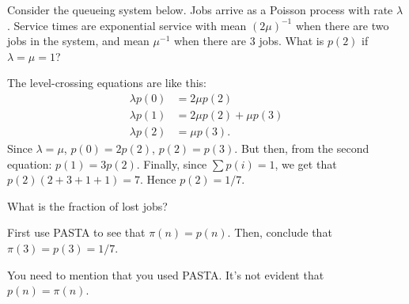\begin{exercise}[201807]\label{ex:86}
Consider the queueing system below. Jobs arrive as a Poisson process with rate $\lambda$. Service times are exponential service with mean $(2\mu)^{-1}$ when there are two jobs in the system, and mean $\mu^{-1}$ when there are 3 jobs. What is $p(2)$ if $\lambda=\mu=1$?

\begin{center}
\end{center}


\begin{solution}
The level-crossing equations are like this:
 \begin{align*}
 \lambda p(0) &= 2\mu p(2) \\
 \lambda p(1) &= 2\mu p(2) +\mu p(3) \\
 \lambda p(2) &= \mu p(3). 
 \end{align*}
Since $\lambda=\mu$, $p(0) = 2p(2)$, $p(2) = p(3)$. But then, from the second equation: $p(1) = 3p(2)$. Finally, since $\sum p(i) = 1$, we get that $p(2)(2+3+1+1)=7$. Hence $p(2)=1/7$. 
\end{solution}
\end{exercise}


\begin{exercise}[201807] 
What is the fraction of lost jobs?
\begin{solution}
 First use PASTA to see that $\pi(n) = p(n)$. Then, conclude that $\pi(3) = p(3) = 1/7$. 

You need to mention that you used PASTA. It's not evident that $p(n)=\pi(n)$. 
\end{solution}
\end{exercise}

